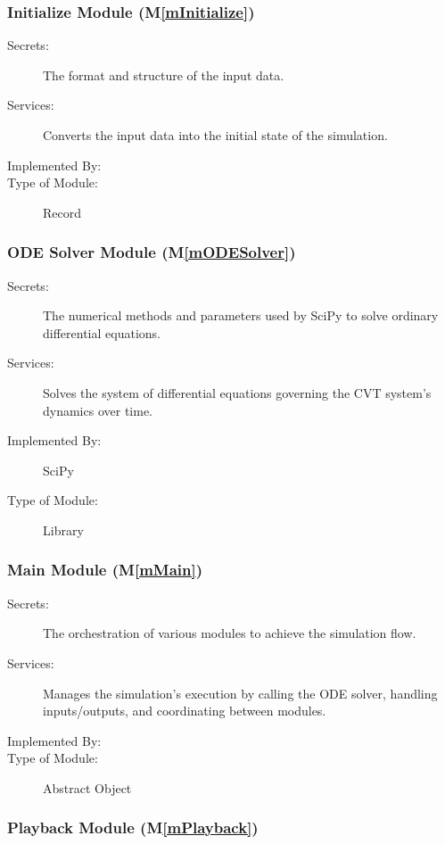 \documentclass[12pt, titlepage]{article}
\newcommand{\mref}[1]{M\ref{#1}}
\begin{document}
\subsubsection{Initialize Module (\mref{mInitialize})}

\begin{description}
\item[Secrets:]The format and structure of the input data.
\item[Services:]Converts the input data into the initial state of the simulation.
\item[Implemented By:] \progname{}
\item[Type of Module:] Record
\end{description}


\subsubsection{ODE Solver Module (\mref{mODESolver})}

\begin{description}
\item[Secrets:] The numerical methods and parameters used by SciPy to solve ordinary differential equations.
\item[Services:] Solves the system of differential equations governing the CVT system's dynamics over time.
\item[Implemented By:] SciPy
\item[Type of Module:] Library
\end{description}

\subsubsection{Main Module (\mref{mMain})}

\begin{description}
\item[Secrets:] The orchestration of various modules to achieve the simulation flow.
\item[Services:] Manages the simulation's execution by calling the ODE solver, handling inputs/outputs, and coordinating between modules.
\item[Implemented By:] \progname{}
\item[Type of Module:] Abstract Object
\end{description}

\subsubsection{Playback Module (\mref{mPlayback})}
\end{document}
